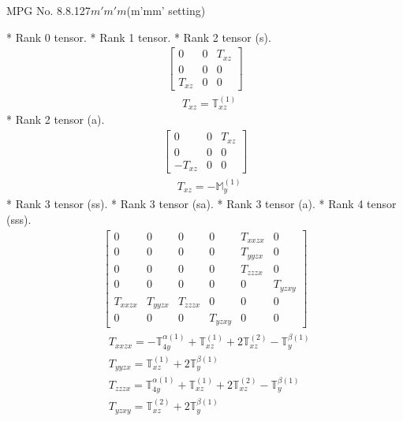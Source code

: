 \documentclass[fleqn,8pt,landscape]{jsarticle}
\begin{document}
\setcounter{MaxMatrixCols}{32}

\renewcommand{\tablename}{Table~}
\renewcommand{\figurename}{Figure~}
\begin{center}
\LARGE
MPG No. 8.8.127\quad$m'm'm$\quad(m'mm' setting)
\end{center}
* Rank 0 tensor.
* Rank 1 tensor.
* Rank 2 tensor (s).
\begin{align*}
\begin{bmatrix} 0 & 0 & T_{xz} \\ 0 & 0 & 0 \\ T_{xz} & 0 & 0 \end{bmatrix}
\end{align*}
\begin{align*}
& T_{xz} = \mathbb{T}_{xz}^{(1)}
\end{align*}
* Rank 2 tensor (a).
\begin{align*}
\begin{bmatrix} 0 & 0 & T_{xz} \\ 0 & 0 & 0 \\ - T_{xz} & 0 & 0 \end{bmatrix}
\end{align*}
\begin{align*}
& T_{xz} = - \mathbb{M}_{y}^{(1)}
\end{align*}
* Rank 3 tensor (ss).
* Rank 3 tensor (sa).
* Rank 3 tensor (a).
* Rank 4 tensor (sss).
\begin{align*}
\begin{bmatrix} 0 & 0 & 0 & 0 & T_{xxzx} & 0 \\ 0 & 0 & 0 & 0 & T_{yyzx} & 0 \\ 0 & 0 & 0 & 0 & T_{zzzx} & 0 \\ 0 & 0 & 0 & 0 & 0 & T_{yzxy} \\ T_{xxzx} & T_{yyzx} & T_{zzzx} & 0 & 0 & 0 \\ 0 & 0 & 0 & T_{yzxy} & 0 & 0 \end{bmatrix}
\end{align*}
\begin{align*}
& T_{xxzx} = - \mathbb{T}_{4y}^{\alpha(1)} + \mathbb{T}_{xz}^{(1)} + 2 \mathbb{T}_{xz}^{(2)} - \mathbb{T}_{y}^{\beta(1)} \\
& T_{yyzx} = \mathbb{T}_{xz}^{(1)} + 2 \mathbb{T}_{y}^{\beta(1)} \\
& T_{zzzx} = \mathbb{T}_{4y}^{\alpha(1)} + \mathbb{T}_{xz}^{(1)} + 2 \mathbb{T}_{xz}^{(2)} - \mathbb{T}_{y}^{\beta(1)} \\
& T_{yzxy} = \mathbb{T}_{xz}^{(2)} + 2 \mathbb{T}_{y}^{\beta(1)}
\end{align*}
\end{document}

